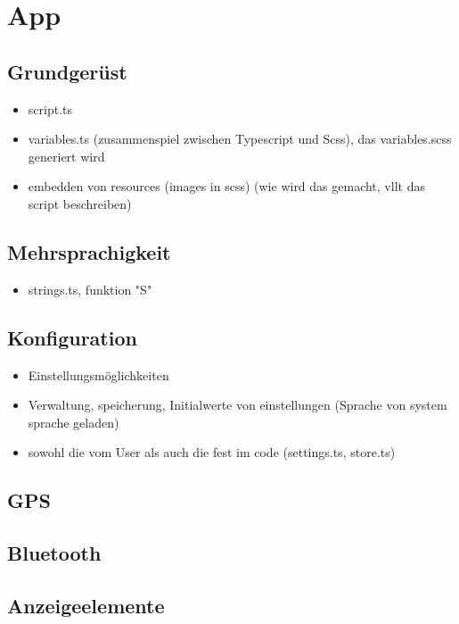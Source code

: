 \section{App}

\subsection{Grundgerüst}

\begin{itemize}
\item script.ts
\item variables.ts (zusammenspiel zwischen Typescript und Scss), das variables.scss generiert wird
\item embedden von resources (images in scss) (wie wird das gemacht, vllt das script beschreiben)
\end{itemize}

\subsection{Mehrsprachigkeit}

\begin{itemize}
\item strings.ts, funktion "S"
\end{itemize}

\subsection{Konfiguration}
\begin{itemize}
\item Einstellungsmöglichkeiten
\item Verwaltung, speicherung, Initialwerte von einstellungen (Sprache von system sprache geladen)
\item sowohl die vom User als auch die fest im code (settings.ts, store.ts)
\end{itemize}

\subsection{GPS}

\subsection{Bluetooth}

\subsection{Anzeigeelemente}

